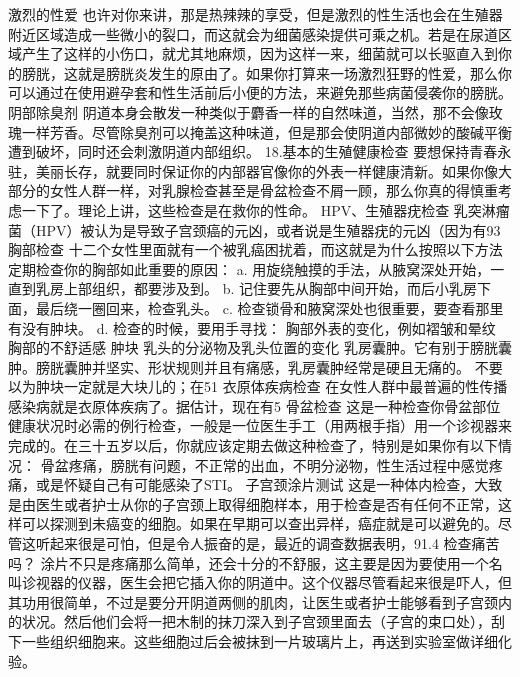 \documentclass[12pt,UTF8]{ctexbook}
\begin{document}
激烈的性爱
也许对你来讲，那是热辣辣的享受，但是激烈的性生活也会在生殖器附近区域造成一些微小的裂口，而这就会为细菌感染提供可乘之机。若是在尿道区域产生了这样的小伤口，就尤其地麻烦，因为这样一来，细菌就可以长驱直入到你的膀胱，这就是膀胱炎发生的原由了。如果你打算来一场激烈狂野的性爱，那么你可以通过在使用避孕套和性生活前后小便的方法，来避免那些病菌侵袭你的膀胱。
阴部除臭剂
阴道本身会散发一种类似于麝香一样的自然味道，当然，那不会像玫瑰一样芳香。尽管除臭剂可以掩盖这种味道，但是那会使阴道内部微妙的酸碱平衡遭到破坏，同时还会刺激阴道内部组织。
18.基本的生殖健康检查
要想保持青春永驻，美丽长存，就要同时保证你的内部器官像你的外表一样健康清新。如果你像大部分的女性人群一样，对乳腺检查甚至是骨盆检查不屑一顾，那么你真的得慎重考虑一下了。理论上讲，这些检查是在救你的性命。
HPV、生殖器疣检查
乳突淋瘤菌（HPV）被认为是导致子宫颈癌的元凶，或者说是生殖器疣的元凶（因为有93%
胸部检查
十二个女性里面就有一个被乳癌困扰着，而这就是为什么按照以下方法定期检查你的胸部如此重要的原因：
a. 用旋绕触摸的手法，从腋窝深处开始，一直到乳房上部组织，都要涉及到。
b. 记住要先从胸部中间开始，而后小乳房下面，最后绕一圈回来，检查乳头。
c. 检查锁骨和腋窝深处也很重要，要查看那里有没有肿块。
d. 检查的时候，要用手寻找：
胸部外表的变化，例如褶皱和晕纹
胸部的不舒适感
肿块
乳头的分泌物及乳头位置的变化
乳房囊肿。它有别于膀胱囊肿。膀胱囊肿并坚实、形状规则并且有痛感，乳房囊肿经常是硬且无痛的。
不要以为肿块一定就是大块儿的；在51%
衣原体疾病检查
在女性人群中最普遍的性传播感染病就是衣原体疾病了。据估计，现在有5%
骨盆检查
这是一种检查你骨盆部位健康状况时必需的例行检查，一般是一位医生手工（用两根手指）用一个诊视器来完成的。在三十五岁以后，你就应该定期去做这种检查了，特别是如果你有以下情况：
骨盆疼痛，膀胱有问题，不正常的出血，不明分泌物，性生活过程中感觉疼痛，或是怀疑自己有可能感染了STI。
子宫颈涂片测试
这是一种体内检查，大致是由医生或者护士从你的子宫颈上取得细胞样本，用于检查是否有任何不正常，这样可以探测到未癌变的细胞。如果在早期可以查出异样，癌症就是可以避免的。尽管这听起来很是可怕，但是令人振奋的是，最近的调查数据表明，91.4%
检查痛苦吗？
涂片不只是疼痛那么简单，还会十分的不舒服，这主要是因为要使用一个名叫诊视器的仪器，医生会把它插入你的阴道中。这个仪器尽管看起来很是吓人，但其功用很简单，不过是要分开阴道两侧的肌肉，让医生或者护士能够看到子宫颈内的状况。然后他们会将一把木制的抹刀深入到子宫颈里面去（子宫的束口处），刮下一些组织细胞来。这些细胞过后会被抹到一片玻璃片上，再送到实验室做详细化验。
\end{document}

